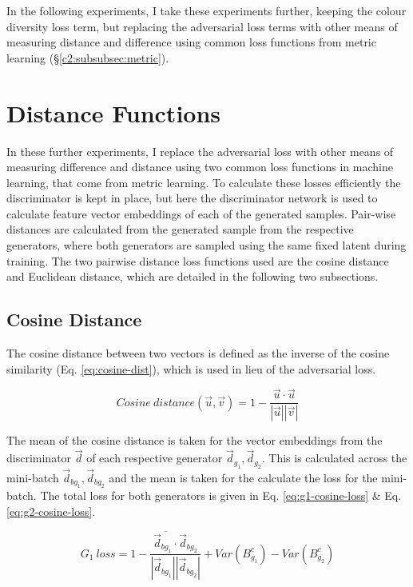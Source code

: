 In the following experiments, I take these experiments further, keeping the colour diversity loss term, but replacing the adversarial loss terms with other means of measuring distance and difference using common loss functions from metric learning (\S \ref{c2:subsubsec:metric}). 
  
\section{Distance Functions}

In these further experiments, I replace the adversarial loss with other means of measuring difference and distance using two common loss functions in machine learning, that come from metric learning. 
To calculate these losses efficiently the discriminator is kept in place, but here the discriminator network is used to calculate feature vector embeddings of each of the generated samples.
Pair-wise distances are calculated from the generated sample from the respective generators, where both generators are sampled using the same fixed latent during training.
The two pairwise distance loss functions used are the cosine distance and Euclidean distance, which are detailed in the following two subsections.

\subsection{Cosine Distance}

The cosine distance between two vectors is defined as the inverse of the cosine similarity (Eq. \ref{eq:cosine-dist}), which is used in lieu of the adversarial loss. 

\begin{equation} 
    Cosine\ distance(\vec u, \vec v) = 1 - \frac{\vec u \cdot \vec u}{|\vec u||\vec v|}
    \label{eq:cosine-dist}
\end{equation}

The mean of the cosine distance is taken for the vector embeddings from the discriminator $\vec d$ of each respective generator $\vec d_{g_{1}}, \vec d_{g_{2}}$. 
This is calculated across the mini-batch $\vec d_{bg_{1}}, \vec d_{bg_{2}}$  and the mean is taken for the calculate the loss for the mini-batch. 
The total loss for both generators is given in Eq. \ref{eq:g1-cosine-loss} \& Eq. \ref{eq:g2-cosine-loss}.

\begin{equation} 
    G_{1}\ loss = \overline{1 - \frac{\vec d_{bg_{1}} \cdot \vec d_{bg_{2}}}{|\vec d_{bg_{1}}||\vec d_{bg_{2}}|}} + Var(B_{g_{1}}^{c}) - Var(B_{g_{2}}^{c})
    \label{eq:g1-cosine-loss}
\end{equation}

